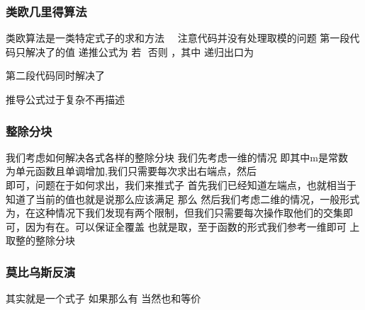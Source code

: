 \documentclass[8pt,a4paper]{article}
\newcommand{\code}[1]{
    
}
\newcommand{\txt}[1]{\par\noindent\footnotesize #1}
\newcommand{\inlineformula}[1]{\ensuremath{}}
\newcommand{\displayformula}[1]{%
    \vspace{0.2em}
    \[
        
    \]
}
\begin{document}
\begin{multicols}{2}
        \subsubsection{类欧几里得算法}
            \txt{类欧算法是一类特定式子的求和方法
\inlineformula{./assets/formulas_tex/formula_134.tex}
\inlineformula{./assets/formulas_tex/formula_135.tex}
\inlineformula{./assets/formulas_tex/formula_136.tex}
注意代码并没有处理取模的问题
第一段代码只解决了\inlineformula{./assets/formulas_tex/formula_137.tex}的值
递推公式为
若\inlineformula{./assets/formulas_tex/formula_138.tex}
\inlineformula{./assets/formulas_tex/formula_139.tex}
否则
\inlineformula{./assets/formulas_tex/formula_140.tex}，其中\inlineformula{./assets/formulas_tex/formula_141.tex}
递归出口为\displayformula{./assets/formulas_tex/formula_142.tex}
第二段代码同时解决了\displayformula{./assets/formulas_tex/formula_143.tex}
推导公式过于复杂不再描述}
            \code{src/number_theory/数论定理_12_5.cpp}
        \subsubsection{整除分块}
            \txt{我们考虑如何解决各式各样的整除分块
我们先考虑一维的情况
即\inlineformula{./assets/formulas_tex/formula_144.tex}其中m是常数 \displayformula{./assets/formulas_tex/formula_145.tex}为单元函数且单调增加,我们只需要每次求出右端点\inlineformula{./assets/formulas_tex/formula_146.tex}，然后\displayformula{./assets/formulas_tex/formula_147.tex}即可，问题在于如何求出\inlineformula{./assets/formulas_tex/formula_148.tex}，我们来推式子
首先我们已经知道左端点\inlineformula{./assets/formulas_tex/formula_149.tex}，也就相当于知道了当前的值\inlineformula{./assets/formulas_tex/formula_150.tex}也就是说\inlineformula{./assets/formulas_tex/formula_151.tex}那么\inlineformula{./assets/formulas_tex/formula_152.tex}应该满足\inlineformula{./assets/formulas_tex/formula_153.tex} 那么\inlineformula{./assets/formulas_tex/formula_154.tex}
然后我们考虑二维的情况，一般形式为\inlineformula{./assets/formulas_tex/formula_155.tex}，在这种情况下我们发现有两个限制，但我们只需要每次操作取他们的交集即可，因为有\inlineformula{./assets/formulas_tex/formula_156.tex}在。可以保证全覆盖
也就是取\inlineformula{./assets/formulas_tex/formula_157.tex}，至于函数的形式我们参考一维即可
上取整的整除分块}
            \code{src/number_theory/数论定理_14_5.cpp}
        \subsubsection{莫比乌斯反演}
            \txt{其实就是一个式子
如果\inlineformula{./assets/formulas_tex/formula_158.tex}那么有\inlineformula{./assets/formulas_tex/formula_159.tex}
当然也和\inlineformula{./assets/formulas_tex/formula_160.tex}等价}

\end{multicols}
\end{document}
